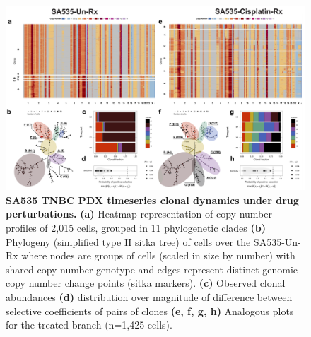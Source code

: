 \begin{figure}
\centering
\includegraphics[width=\textwidth]{Figures/SA535analysis.png}
	
\caption[SA535 TNBC PDX timeseries clonal dynamics under drug perturbations]
	{\small
	\textbf{SA535 TNBC PDX timeseries clonal dynamics under drug perturbations.}
	     \textbf{(a)} Heatmap representation of copy number profiles of
2,015 cells, grouped in 11 phylogenetic clades  \textbf{(b)} Phylogeny (simplified type II sitka tree) of cells over the SA535-Un-Rx where nodes are groups of cells (scaled in size by number) with shared copy number genotype and edges represent distinct genomic copy number change points (sitka markers). \textbf{(c)} Observed clonal abundances \textbf{(d)} distribution over magnitude of difference between selective coefficients of pairs of clones \textbf{(e, f, g, h)} Analogous plots for the treated branch (n=1,425 cells).
	}
	\label{fig:SA535analysis}
\end{figure}


